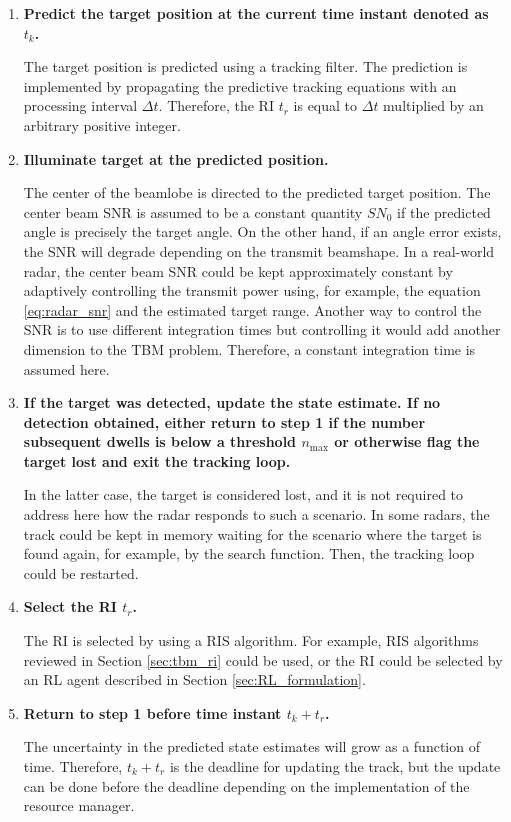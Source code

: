 \documentclass[english, 12pt, a4paper, elec, utf8, a-1b, online]{aaltothesis}
\numberwithin{equation}{section}
\newcommand{\nmax}{n_\text{max}}
\newcommand{\dt}{\Delta t}
\newcommand{\ri}{t_r}
\begin{document}
\begin{enumerate}
\item\textbf{Predict the target position at the current time instant denoted as $t_k$.}

The target position is predicted using a tracking filter. The prediction is implemented by propagating the predictive tracking equations with an processing interval $\dt$. 
Therefore, the RI $t_r$ is equal to $\dt$ multiplied by an arbitrary positive integer.

\item\textbf{Illuminate target at the predicted position.}

The center of the beamlobe is directed to the predicted target position. 
The center beam SNR is assumed to be a constant quantity $SN_0$ if the predicted angle is precisely the target angle. 
On the other hand, if an angle error exists, the SNR will degrade depending on the transmit beamshape. 
In a real-world radar, the center beam SNR could be kept approximately constant by adaptively controlling the transmit power using, for example, the equation \eqref{eq:radar_snr} and the estimated target range. 
Another way to control the SNR is to use different integration times but controlling it would add another dimension to the TBM problem. 
Therefore, a constant integration time is assumed here.

\item\textbf{If the target was detected, update the state estimate. If no detection obtained, either return to step 1 if the number subsequent dwells is below a threshold $\nmax$ or otherwise flag the target lost and exit the tracking loop.}

In the latter case, the target is considered lost, and it is not required to address here how the radar responds to such a scenario. 
In some radars, the track could be kept in memory waiting for the scenario where the target is found again, for example, by the search function. 
Then, the tracking loop could be restarted.


\item\textbf{Select the RI $\ri$.}

The RI is selected by using a RIS algorithm.
For example, RIS algorithms reviewed in Section \ref{sec:tbm_ri} could be used, or the RI could be selected by an RL agent described in Section \ref{sec:RL_formulation}.

\item\textbf{Return to step 1 before time instant $t_k + \ri$.}

The uncertainty in the predicted state estimates will grow as a function of time. Therefore, $t_k + \ri$ is the deadline for updating the track, but the update can be done before the deadline depending on the implementation of the resource manager.

\end{enumerate}
\end{document}
